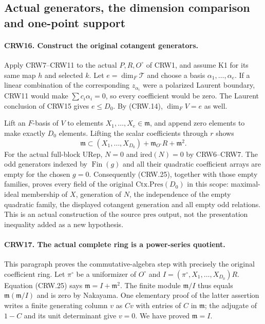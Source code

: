 \subsection{Actual generators, the dimension comparison and one-point support}

\paragraph{CRW16. Construct the original cotangent generators.}
\label{claim:CRW16}
Apply CRW7--CRW11 to the actual $P,R,O^\circ$ of CRW1,
and assume K1 for its same map $h$ and selected $k$.
Let $e=\dim_F\mathcal T$ and choose a basis
$\alpha_1,\ldots,\alpha_e$.
If a linear combination of the corresponding $z_{\alpha_i}$
were a polarized Laurent boundary, CRW11 would make
$\sum c_i\alpha_i=0$, so every coefficient would be zero.
The Laurent conclusion of CRW15 gives $e\le D_0$.
By (CRW.14), $\dim_FV=e$ as well.

Lift an $F$-basis of $V$ to elements
$X_1,\ldots,X_e\in\mathfrak m$, and append zero
elements to make exactly $D_0$ elements.  Lifting
the scalar coefficients through $r$ shows
\[
 \mathfrak m\subset (X_1,\ldots,X_{D_0})
               +\mathfrak m_{O^\circ}R+\mathfrak m^2.
                                                               \tag{CRW.25}
\]
For the actual full-block URep, $N=0$ and
$\mathrm{ired}(N)=0$ by CRW6--CRW7.
The odd generators indexed by $\operatorname{Fin}(g)$
and all their quadratic coefficient arrays are empty
for the chosen $g=0$.
Consequently (CRW.25), together with those empty
families, proves every field of the original
$\mathrm{Ctx.Pres}(D_0)$ in this scope: maximal-ideal
membership of $X$, generation of $N$, the independence
of the empty quadratic family, the displayed
cotangent generation and all empty odd relations.
This is an actual construction of the source
$\mathrm{pres}$ output, not the presentation inequality
added as a new hypothesis.

\paragraph{CRW17. The actual complete ring is a power-series quotient.}
\label{claim:CRW17}
This paragraph proves the commutative-algebra step
with precisely the original coefficient ring.
Let $\pi^\circ$ be a uniformizer of $O^\circ$ and
$I=(\pi^\circ,X_1,\ldots,X_{D_0})R$.
Equation (CRW.25) says $\mathfrak m=I+\mathfrak m^2$.
The finite module $\mathfrak m/I$ thus equals
$\mathfrak m(\mathfrak m/I)$ and is zero by Nakayama.
One elementary proof of the latter assertion writes a
finite generating column $v$ as $Cv$ with entries of
$C$ in $\mathfrak m$; the adjugate of $1-C$ and its
unit determinant give $v=0$.
We have proved $\mathfrak m=I$.

